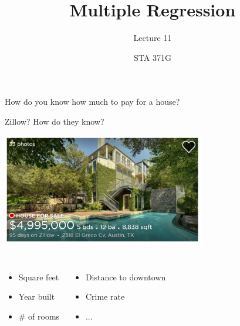 \documentclass{beamer}\usepackage[]{graphicx}\usepackage[]{color}
\title{Multiple Regression}
\subtitle{Lecture 11}
\author{STA 371G}
\begin{document}
  
  
  

  \frame{\maketitle}



  \begin{darkframes}    
    \begin{frame}
      How do you know how much to pay for a house? \pause
      
      Zillow? How do they know? 
      
      \begin{center}
        \includegraphics[width=3.5in]{zillow} \\
      \end{center} \pause
      
      \begin{columns}[onlytextwidth]
          \begin{itemize}
            \item Square feet
            \item Year built
            \item \# of rooms
          \end{itemize}
          \begin{itemize}
            \item Distance to downtown
            \item Crime rate
            \item ...
          \end{itemize}
      \end{columns}
      

\end{frame}
\end{darkframes}
\end{document}
